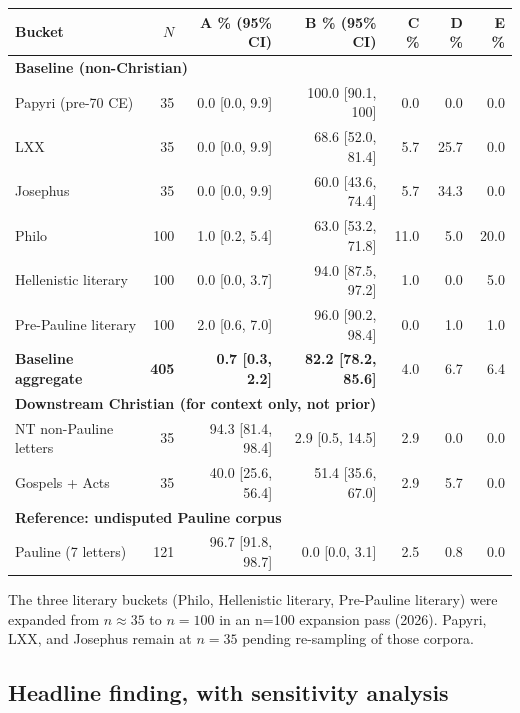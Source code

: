 \documentclass[11pt,oneside]{article}
\begin{document}
\begin{center}
\footnotesize
\setlength{\tabcolsep}{4pt}
\begin{tabular}{lrrrrrr}
\toprule
Bucket & $N$ & A \% (95\% CI) & B \% (95\% CI) & C \% & D \% & E \% \\
\midrule
\multicolumn{7}{l}{\textbf{Baseline (non-Christian)}} \\
Papyri (pre-70 CE)     & 35  & 0.0 [0.0, 9.9]   & 100.0 [90.1, 100] & 0.0  & 0.0  & 0.0 \\
LXX                    & 35  & 0.0 [0.0, 9.9]   & 68.6 [52.0, 81.4] & 5.7  & 25.7 & 0.0 \\
Josephus               & 35  & 0.0 [0.0, 9.9]   & 60.0 [43.6, 74.4] & 5.7  & 34.3 & 0.0 \\
Philo                  & 100 & 1.0 [0.2, 5.4]   & 63.0 [53.2, 71.8] & 11.0 & 5.0  & 20.0 \\
Hellenistic literary   & 100 & 0.0 [0.0, 3.7]   & 94.0 [87.5, 97.2] & 1.0  & 0.0  & 5.0 \\
Pre-Pauline literary   & 100 & 2.0 [0.6, 7.0]   & 96.0 [90.2, 98.4] & 0.0  & 1.0  & 1.0 \\
\midrule
\textbf{Baseline aggregate} & \textbf{405} & \textbf{0.7 [0.3, 2.2]} & \textbf{82.2 [78.2, 85.6]} & 4.0 & 6.7 & 6.4 \\
\midrule
\multicolumn{7}{l}{\textbf{Downstream Christian (for context only, not prior)}} \\
NT non-Pauline letters & 35  & 94.3 [81.4, 98.4] & 2.9 [0.5, 14.5]   & 2.9  & 0.0  & 0.0 \\
Gospels + Acts         & 35  & 40.0 [25.6, 56.4] & 51.4 [35.6, 67.0] & 2.9  & 5.7  & 0.0 \\
\midrule
\multicolumn{7}{l}{\textbf{Reference: undisputed Pauline corpus}} \\
Pauline (7 letters)    & 121 & 96.7 [91.8, 98.7] & 0.0 [0.0, 3.1]    & 2.5  & 0.8  & 0.0 \\
\bottomrule
\end{tabular}
\end{center}

The three literary buckets (Philo, Hellenistic literary, Pre-Pauline
literary) were expanded from $n\approx35$ to $n=100$ in an n=100
expansion pass (2026).  Papyri, LXX, and Josephus remain at $n=35$
pending re-sampling of those corpora.

\subsection*{Headline finding, with sensitivity analysis}
\end{document}
